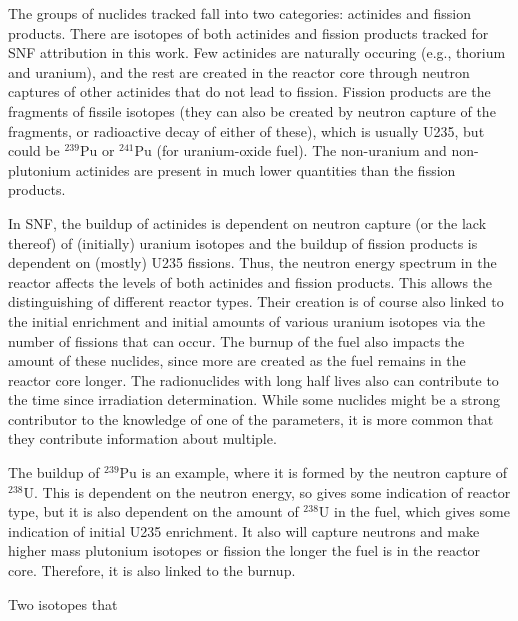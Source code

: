 The groups of nuclides tracked fall into two categories: actinides and fission
products. There are isotopes of both actinides and fission products tracked for
\gls{SNF} attribution in this work.  Few actinides are naturally occuring
(e.g., thorium and uranium), and the rest are created in the reactor core
through neutron captures of other actinides that do not lead to fission.
Fission products are the fragments of fissile isotopes (they can also be
created by neutron capture of the fragments, or radioactive decay of either of
these), which is usually \gls{U235}, but could be ${}^{239}\text{Pu}$ or
${}^{241}\text{Pu}$ (for uranium-oxide fuel).  The non-uranium and
non-plutonium actinides are present in much lower quantities than the fission
products.

In \gls{SNF}, the buildup of actinides is dependent on neutron capture (or the
lack thereof) of (initially) uranium isotopes and the buildup of fission
products is dependent on (mostly) \gls{U235} fissions. Thus, the neutron energy
spectrum in the reactor affects the levels of both actinides and fission
products.  This allows the distinguishing of different reactor types.  Their
creation is of course also linked to the initial enrichment and initial amounts
of various uranium isotopes via the number of fissions that can occur.  The
burnup of the fuel also impacts the amount of these nuclides, since more are
created as the fuel remains in the reactor core longer.  The radionuclides with
long half lives also can contribute to the time since irradiation
determination. While some nuclides might be a strong contributor to the
knowledge of one of the parameters, it is more common that they contribute
information about multiple. 

The buildup of ${}^{239}\text{Pu}$ is an example, where it is formed by the
neutron capture of ${}^{238}\text{U}$. This is dependent on the neutron energy,
so gives some indication of reactor type, but it is also dependent on the
amount of ${}^{238}\text{U}$ in the fuel, which gives some indication of
initial \gls{U235} enrichment. It also will capture neutrons and make higher
mass plutonium isotopes or fission the longer the fuel is in the reactor core.
Therefore, it is also linked to the burnup.

Two isotopes that 
